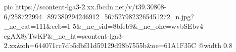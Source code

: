  
 
 
 
 

\ifcmt
  pic https://scontent-lga3-2.xx.fbcdn.net/v/t39.30808-6/258722994_897380294246912_5675279823265451272_n.jpg?_nc_cat=111&ccb=1-5&_nc_sid=8bfeb9&_nc_ohc=wvbSEbv4-egAX8yTwKP&_nc_ht=scontent-lga3-2.xx&oh=644071cc7db5dbf31d59129d98b7555b&oe=61A1F35C
  @width 0.8
\fi
